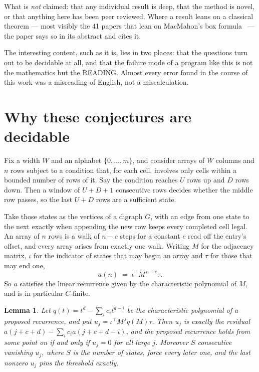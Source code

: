 \documentclass[11pt,a4paper]{article}
\theoremstyle{plain}
\newtheorem{lemma}[theorem]{Lemma}
\theoremstyle{definition}
\begin{document}
What is \emph{not} claimed: that any individual result is deep, that the method is novel, or
that anything here has been peer reviewed. Where a result leans on a classical theorem --- most
visibly the 41 papers that lean on MacMahon's box formula~\cite{macmahon} --- the paper says so
in its abstract and cites it.

The interesting content, such as it is, lies in two places: that the questions turn out to be
decidable at all, and that the failure mode of a program like this is not the mathematics but
the READING. Almost every error found in the course of this work was a misreading of English,
not a miscalculation.

\section{Why these conjectures are decidable}

Fix a width $W$ and an alphabet $\{0,\dots,m\}$, and consider arrays of $W$ columns and $n$
rows subject to a condition that, for each cell, involves only cells within a bounded number of
rows of it. Say the condition reaches $U$ rows up and $D$ rows down. Then a window of $U+D+1$
consecutive rows decides whether the middle row passes, so the last $U+D$ rows are a sufficient
state.

Take those states as the vertices of a digraph $G$, with an edge from one state to the next
exactly when appending the new row keeps every completed cell legal. An array of $n$ rows is a
walk of $n-c$ steps for a constant $c$ read off the entry's offset, and every array arises from
exactly one walk. Writing $M$ for the adjacency matrix, $\iota$ for the indicator of states
that may begin an array and $\tau$ for those that may end one,
\[
a(n)\;=\;\iota^{\!\top}M^{\,n-c}\tau .
\]
So $a$ satisfies the linear recurrence given by the characteristic polynomial of $M$, and is in
particular $C$-finite.

\begin{lemma}\label{lem:crit}
Let $q(t)=t^{d}-\sum_i c_it^{d-i}$ be the characteristic polynomial of a proposed recurrence,
and put $u_j=\iota^{\!\top}M^{\,j}q(M)\tau$. Then $u_j$ is exactly the residual
$a(j+c+d)-\sum_ic_ia(j+c+d-i)$, and the proposed recurrence holds from some point on if and
only if $u_j=0$ for all large $j$. Moreover $S$ consecutive vanishing $u_j$, where $S$ is the
number of states, force every later one, and the last nonzero $u_j$ pins the threshold exactly.
\end{lemma}
\end{document}
